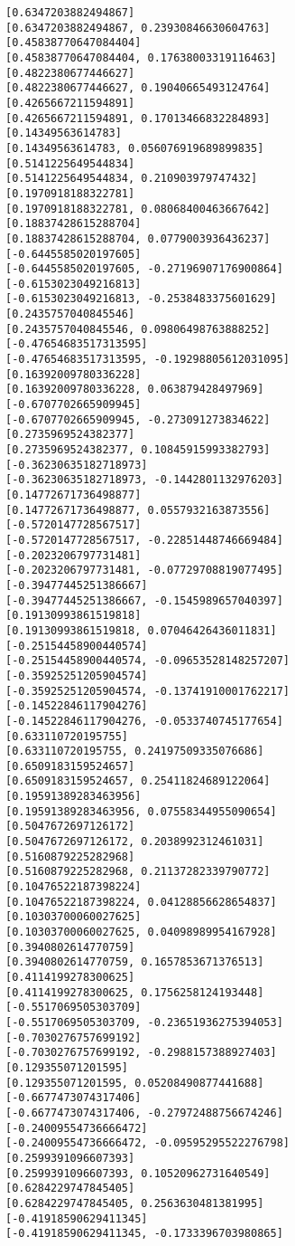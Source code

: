 \documentclass[11pt]{article}
\begin{document}
\begin{Verbatim}[commandchars=\\\{\}]
[0.6347203882494867]
[0.6347203882494867, 0.23930846630604763]
[0.45838770647084404]
[0.45838770647084404, 0.17638003319116463]
[0.4822380677446627]
[0.4822380677446627, 0.19040665493124764]
[0.4265667211594891]
[0.4265667211594891, 0.17013466832284893]
[0.14349563614783]
[0.14349563614783, 0.056076919689899835]
[0.5141225649544834]
[0.5141225649544834, 0.210903979747432]
[0.1970918188322781]
[0.1970918188322781, 0.08068400463667642]
[0.18837428615288704]
[0.18837428615288704, 0.0779003936436237]
[-0.6445585020197605]
[-0.6445585020197605, -0.27196907176900864]
[-0.6153023049216813]
[-0.6153023049216813, -0.2538483375601629]
[0.2435757040845546]
[0.2435757040845546, 0.09806498763888252]
[-0.47654683517313595]
[-0.47654683517313595, -0.19298805612031095]
[0.16392009780336228]
[0.16392009780336228, 0.063879428497969]
[-0.6707702665909945]
[-0.6707702665909945, -0.273091273834622]
[0.2735969524382377]
[0.2735969524382377, 0.10845915993382793]
[-0.36230635182718973]
[-0.36230635182718973, -0.1442801132976203]
[0.14772671736498877]
[0.14772671736498877, 0.0557932163873556]
[-0.5720147728567517]
[-0.5720147728567517, -0.22851448746669484]
[-0.2023206797731481]
[-0.2023206797731481, -0.07729708819077495]
[-0.39477445251386667]
[-0.39477445251386667, -0.1545989657040397]
[0.19130993861519818]
[0.19130993861519818, 0.07046426436011831]
[-0.25154458900440574]
[-0.25154458900440574, -0.09653528148257207]
[-0.35925251205904574]
[-0.35925251205904574, -0.13741910001762217]
[-0.14522846117904276]
[-0.14522846117904276, -0.0533740745177654]
[0.633110720195755]
[0.633110720195755, 0.24197509335076686]
[0.6509183159524657]
[0.6509183159524657, 0.25411824689122064]
[0.19591389283463956]
[0.19591389283463956, 0.07558344955090654]
[0.5047672697126172]
[0.5047672697126172, 0.2038992312461031]
[0.5160879225282968]
[0.5160879225282968, 0.21137282339790772]
[0.10476522187398224]
[0.10476522187398224, 0.04128856628654837]
[0.10303700060027625]
[0.10303700060027625, 0.04098989954167928]
[0.3940802614770759]
[0.3940802614770759, 0.1657853671376513]
[0.4114199278300625]
[0.4114199278300625, 0.1756258124193448]
[-0.5517069505303709]
[-0.5517069505303709, -0.23651936275394053]
[-0.7030276757699192]
[-0.7030276757699192, -0.2988157388927403]
[0.129355071201595]
[0.129355071201595, 0.05208490877441688]
[-0.6677473074317406]
[-0.6677473074317406, -0.27972488756674246]
[-0.24009554736666472]
[-0.24009554736666472, -0.09595295522276798]
[0.2599391096607393]
[0.2599391096607393, 0.10520962731640549]
[0.6284229747845405]
[0.6284229747845405, 0.2563630481381995]
[-0.41918590629411345]
[-0.41918590629411345, -0.1733396703980865]

\end{Verbatim}
\end{document}
